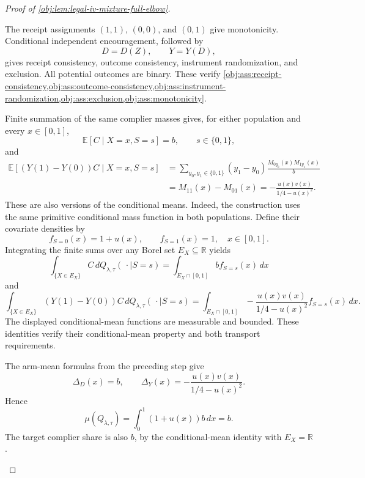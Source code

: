 \begin{proof}[Proof of \cref{obj:lem:legal-iv-mixture-full-elbow}]
\begin{enumerate}
The receipt assignments \((1,1)\), \((0,0)\), and \((0,1)\) give monotonicity. Conditional independent encouragement, followed by
\[
D=D(Z),\qquad Y=Y(D),
\]
gives receipt consistency, outcome consistency, instrument randomization, and exclusion. All potential outcomes are binary. These verify
\cref{obj:ass:receipt-consistency,obj:ass:outcome-consistency,obj:ass:instrument-randomization,obj:ass:exclusion,obj:ass:monotonicity}.

Finite summation of the same complier masses gives, for either population and every \(x\in[0,1]\),
\[
\mathbb E[C\mid X=x,S=s]=b,
\qquad s\in\{0,1\},
\]
and
\[
\begin{aligned}
\mathbb E[(Y(1)-Y(0))C\mid X=x,S=s]
&=
\sum_{y_0,y_1\in\{0,1\}}
(y_1-y_0)\frac{M_{0y_0}(x)M_{1y_1}(x)}b\\
&=M_{11}(x)-M_{01}(x)
=-\frac{u(x)v(x)}{1/4-u(x)^2}.
\end{aligned}
\]
These are also versions of the conditional means. Indeed, the construction uses the same primitive conditional mass function in both populations. Define their covariate densities by
\[
f_{S=0}(x)=1+u(x),\qquad f_{S=1}(x)=1,
\quad x\in[0,1].
\]
Integrating the finite sums over any Borel set \(E_X\subseteq\mathbb R\) yields
\[
\int_{\{X\in E_X\}} C\,dQ_{\lambda,\tau}(\,\cdot\mid S=s)
=
\int_{E_X\cap[0,1]}b f_{S=s}(x)\,dx
\]
and
\[
\int_{\{X\in E_X\}}(Y(1)-Y(0))C\,
dQ_{\lambda,\tau}(\,\cdot\mid S=s)
=
\int_{E_X\cap[0,1]}
-\frac{u(x)v(x)}{1/4-u(x)^2}f_{S=s}(x)\,dx.
\]
The displayed conditional-mean functions are measurable and bounded. These identities verify their conditional-mean property and both transport requirements.

The arm-mean formulas from the preceding step give
\[
\Delta_D(x)=b,\qquad
\Delta_Y(x)=-\frac{u(x)v(x)}{1/4-u(x)^2}.
\]
Hence
\[
\mu(Q_{\lambda,\tau})
=
\int_0^1(1+u(x))b\,dx=b.
\]
The target complier share is also \(b\), by the conditional-mean identity with \(E_X=\mathbb R\).


\end{enumerate}
\end{proof}
